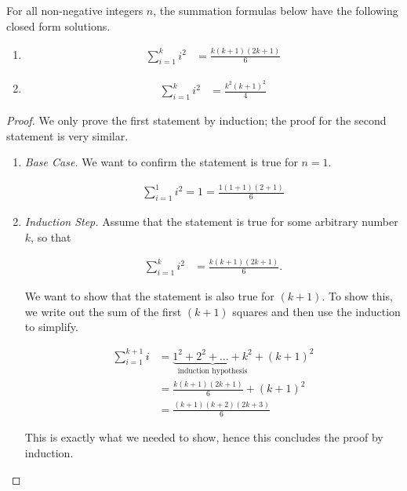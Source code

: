 \vspace{\baselineskip}
\begin{theorem}
	For all non-negative integers $n$, the summation formulas below have the following closed form solutions.
	
	\begin{enumerate}
		\item 
		\begin{align}
			\sum_{i = 1}^k i^2 &= \frac{k(k + 1)(2k + 1)}{6}
		\end{align}

		\item 
		\begin{align}
			\sum_{i = 1}^k i^2 &= \frac{k^2(k + 1)^2}{4}
		\end{align}
	\end{enumerate}
\end{theorem}
\begin{proof}
	We only prove the first statement by induction; the proof for the second statement is very similar.
	
	\vspace{\baselineskip}
	\begin{enumerate}
		\item \emph{Base Case.} We want to confirm the statement is true for $n = 1$.
		
		\begin{align*}
			\sum_{i = 1}^1 i^2 = 1 = \frac{1 (1 + 1) (2 + 1)}{6}
		\end{align*}
		
		\item \emph{Induction Step.} Assume that the statement is true for some arbitrary number $k$, so that
		
		\begin{align*}
			\sum_{i = 1}^k i^2 &= \frac{k(k + 1)(2k + 1)}{6}.
		\end{align*}
		
		We want to show that the statement is also true for $(k + 1)$. To show this, we write out the sum of the first $(k + 1)$ squares and then use the induction to simplify.
						
		\begin{align*}
			\sum_{i = 1}^{k + 1} i &= \underbrace{1^2 + 2^2 + \dots + k^2}_\text{induction hypothesis} + (k + 1)^2  \\
			&= \frac{k(k + 1)(2k + 1)}{6} + (k + 1)^2 \\
			&= \frac{(k + 1)(k + 2)(2k + 3)}{6}
		\end{align*}
		
		This is exactly what we needed to show, hence this concludes the proof by induction.
	\end{enumerate}
\end{proof}
\vspace{\baselineskip}


